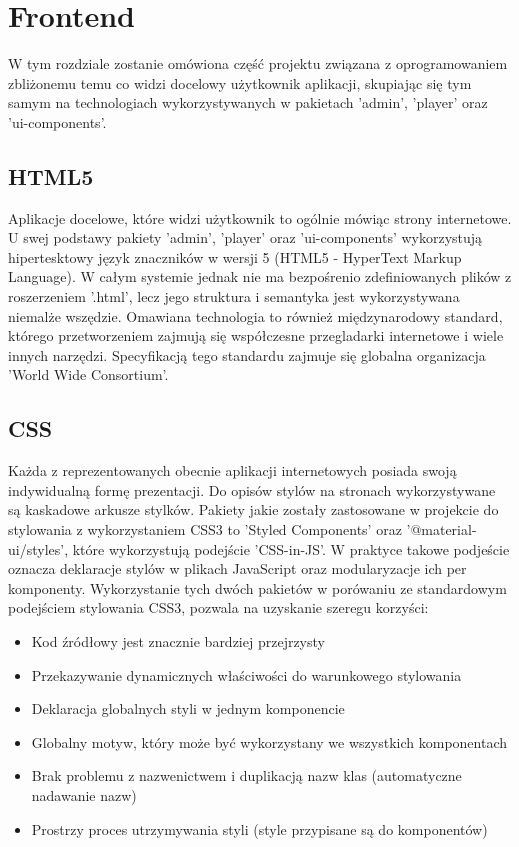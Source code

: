 \chapter{Frontend}
\label{ch:frontend}
W tym rozdziale zostanie omówiona część projektu związana z oprogramowaniem zbliżonemu temu co widzi docelowy użytkownik aplikacji, skupiając się tym samym na technologiach wykorzystywanych w pakietach 'admin', 'player' oraz 'ui-components'.

\section{HTML5}
Aplikacje docelowe, które widzi użytkownik to ogólnie mówiąc strony internetowe. U swej podstawy pakiety 'admin', 'player' oraz 'ui-components' wykorzystują hipertesktowy język znaczników w wersji 5 (HTML5 - HyperText Markup Language). W całym systemie jednak nie ma bezpośrenio zdefiniowanych plików z roszerzeniem '.html', lecz jego struktura i semantyka jest wykorzystywana niemalże wszędzie. Omawiana technologia to również międzynarodowy standard, którego przetworzeniem zajmują się współczesne przegladarki internetowe i wiele innych narzędzi. Specyfikacją tego standardu zajmuje się globalna organizacja 'World Wide Consortium'. \cite{HTMLDocs}

\section{CSS}
Każda z reprezentowanych obecnie aplikacji internetowych posiada swoją indywidualną formę prezentacji. Do opisów stylów na stronach wykorzystywane są kaskadowe arkusze stylków. Pakiety jakie zostały zastosowane w projekcie do stylowania z wykorzystaniem CSS3 to 'Styled Components' oraz '@material-ui/styles', które wykorzystują podejście 'CSS-in-JS'. W praktyce takowe podjeście oznacza deklaracje stylów w plikach JavaScript oraz modularyzacje ich per komponenty. Wykorzystanie tych dwóch pakietów w porówaniu ze standardowym podejściem stylowania CSS3, pozwala na uzyskanie szeregu korzyści:

\begin{itemize}
    \item Kod źródłowy jest znacznie bardziej przejrzysty
    \item Przekazywanie dynamicznych właściwości do warunkowego stylowania
    \item Deklaracja globalnych styli w jednym komponencie
    \item Globalny motyw, który może być wykorzystany we wszystkich komponentach
    \item Brak problemu z nazwenictwem i duplikacją nazw klas (automatyczne nadawanie nazw)
    \item Prostrzy proces utrzymywania styli (style przypisane są do komponentów)
\end{itemize}

